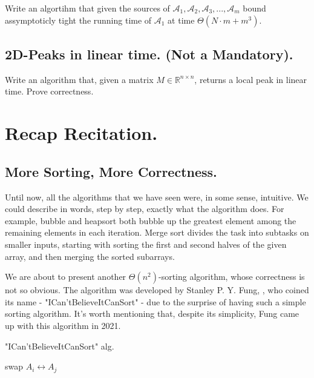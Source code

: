 Write an algortihm that given the sources of $\mathcal{A}_{1},\mathcal{A}_{2},\mathcal{A}_{3},...,\mathcal{A}_{m}$ bound assymptoticly tight the running time of $\mathcal{A}_{1}$ at time $\Theta\left( N\cdot m + m^{3} \right)$. 


\section{2D-Peaks in linear time. (Not a Mandatory).} Write an algorithm that, given a matrix $M \in \mathbb{R}^{n\times n}$, returns a local peak in linear time. Prove correctness.

\ifdefined\SOLUTION

\fi 
\ifdefined\Book
\fi




\ifdefined\BOOK
\else
\setcounter{chapter}{4}
\fi
\chapter{Recap Recitation.} 



\section{More Sorting, More Correctness.}
Until now, all the algorithms that we have seen were, in some sense, intuitive. We could describe in words, step by step, exactly what the algorithm does. For example, bubble and heapsort both bubble up the greatest element among the remaining elements in each iteration. Merge sort divides the task into subtasks on smaller inputs, starting with sorting the first and second halves of the given array, and then merging the sorted subarrays.

We are about to present another $\Theta(n^{2})$-sorting algorithm, whose correctness is not so obvious. The algorithm was developed by Stanley P. Y. Fung, \cite{Simplesort}, who coined its name - "ICan'tBelieveItCanSort" - due to the surprise of having such a simple sorting algorithm. It's worth mentioning that, despite its simplicity, Fung came up with this algorithm in 2021.


\begin{algorithm}
\SetAlgoLined
{}
\caption{ "ICan'tBelieveItCanSort"  alg.}
 {
   {
     {
      swap $A_{i} \leftrightarrow A_{j}$
    }
  }
}


\end{algorithm}

